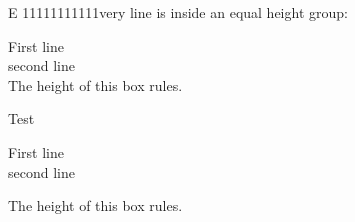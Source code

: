E 11111111111very line is inside an equal height group:
\begin{tcbraster}[raster equal height,
title=Box \thetcbrasternum,
enhanced,size=small]
\begin{tcolorbox}First line\\second line\\
The height of this box rules.\end{tcolorbox}
\begin{tcolorbox}Test\end{tcolorbox}
\begin{tcolorbox}
First line\\second line\end{tcolorbox}
\begin{tcolorbox}The height of this box rules.\end{tcolorbox}
\end{tcbraster}


\clearpage

